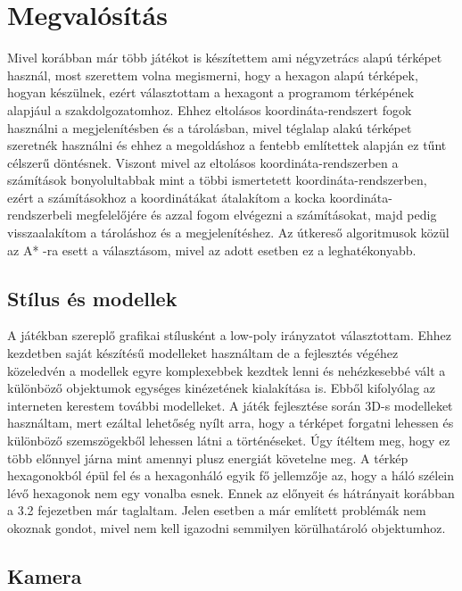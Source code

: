 \chapter{Megvalósítás}

Mivel korábban már több játékot is készítettem ami négyzetrács alapú térképet használ, most szerettem volna megismerni, hogy a hexagon alapú térképek,
 hogyan készülnek, ezért választottam a hexagont a programom térképének alapjául a szakdolgozatomhoz. Ehhez eltolásos koordináta-rendszert fogok használni a megjelenítésben és a tárolásban, mivel téglalap alakú térképet szeretnék használni és ehhez a megoldáshoz a fentebb említettek alapján ez tűnt célszerű döntésnek. Viszont mivel az eltolásos koordináta-rendszerben a számítások bonyolultabbak mint a többi ismertetett koordináta-rendszerben, ezért a számításokhoz a koordinátákat átalakítom a kocka koordináta-rendszerbeli megfelelőjére és azzal fogom elvégezni a számításokat, majd pedig visszaalakítom a tároláshoz és a megjelenítéshez. Az útkereső algoritmusok közül az A* -ra esett a választásom, mivel az adott esetben ez a leghatékonyabb.

\section{Stílus és modellek}

A játékban szereplő grafikai stílusként a low-poly irányzatot választottam. Ehhez kezdetben saját készítésű modelleket használtam de a fejlesztés végéhez közeledvén a modellek egyre komplexebbek kezdtek lenni és nehézkesebbé vált a különböző objektumok egységes kinézetének kialakítása is. Ebből kifolyólag az interneten kerestem további modelleket.
\newline
\newline A játék fejlesztése során 3D-s modelleket használtam, mert ezáltal lehetőség nyílt arra, hogy a térképet forgatni lehessen és különböző szemszögekből lehessen látni a történéseket. Úgy ítéltem meg, hogy ez több előnnyel járna mint amennyi plusz energiát követelne meg.
\newline
\newline A térkép hexagonokból épül fel és a hexagonháló egyik fő jellemzője az, hogy a háló szélein lévő hexagonok nem egy vonalba esnek. Ennek az előnyeit és hátrányait korábban a 3.2 fejezetben már taglaltam. Jelen esetben a már említett problémák nem okoznak gondot, mivel nem kell igazodni semmilyen körülhatároló objektumhoz.

\section{Kamera}

